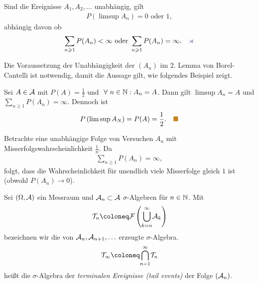 \begin{corn}
Sind die Ereignisse $A_1,A_2,\ldots$ unabhängig, gilt
\begin{align*}
P(\limsup A_n) = 0\text{ oder }1,
\end{align*}
abhängig davon ob
\begin{align*}
\sum\limits_{n\ge 1} P(A_n) < \infty\text{ oder }
\sum\limits_{n\ge 1} P(A_n) = \infty.\fishhere 
\end{align*}
\end{corn}


Die Voraussetzung der Unabhängigkeit der $(A_n)$ im 2. Lemma von Borel-Cantelli
ist notwendig, damit die Aussage gilt, wie folgendes Beispiel zeigt.
\begin{bsp}
Sei $A\in\AA$ mit $P(A) =\frac{1}{2}$ und $\forall n\in\N : A_n = A$. Dann gilt
$\limsup A_n = A$ und $\sum_{n\ge 1} P(A_n) = \infty$. Dennoch ist
\begin{align*}
P\left(\limsup A_N\right) = P(A) = \frac{1}{2}.\bsphere
\end{align*}
\end{bsp}
\begin{bsp}
Betrachte eine unabhängige Folge von Versuchen $A_n$ mit
Misserfolgswahrscheinlichkeit $\frac{1}{n}$. Da
\begin{align*}
\sum_{n\ge 1}P\left(A_n\right) = \infty,
\end{align*}
folgt, dass die Wahrscheinlichkeit für unendlich viele Misserfolge gleich $1$
ist (obwohl $P(A_n)\to 0$).\bsphere
\end{bsp}

\begin{defn}
\label{defn:5.4}
Sei $(\Omega, \AA)$ ein Messraum und $\AA_{n} \subset \AA$  $\sigma$-Algebren
für $n\in \N$. Mit
\begin{align*}
\TT_{n} \defl \FF\left({\bigcup^
{\infty}_{k=n}} \AA_{k}\right)
\end{align*}
bezeichnen wir die von $\AA_{n}, {\AA}_{n+1}, \ldots $ erzeugte
$\sigma$-Algebra.
\begin{align*}
\TT_{\infty}\defl {\bigcap^ {\infty}_{n=1}} {\TT}_{n}
\end{align*}
heißt die $\sigma$-Algebra der \emph{terminalen Ereignisse (tail events)}
der Folge $(\AA_{n})$.\fishhere
\end{defn}

